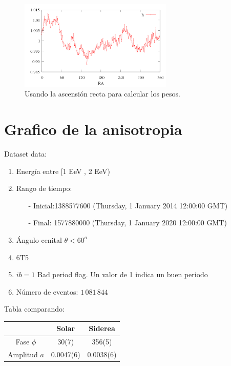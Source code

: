 		
		\begin{figure}[H]
			\centering
			\includegraphics[width=0.65\textwidth]{eventos_RA.png}
			\caption{Usando la ascensión recta para calcular los pesos.}
		\end{figure}
		

\section{Grafico de la anisotropia}

		
		Dataset data:
		
		
		\begin{enumerate}
			\item Energía entre  [1 EeV , 2 EeV)
			\item Rango de tiempo:
			\begin{itemize}
				\item[-] Inicial:1388577600 (Thursday, 1 January 2014 12:00:00 GMT)
				\item[-] Final: 1577880000  (Thursday, 1 January 2020 12:00:00 GMT)
			\end{itemize}
			\item Ángulo cenital $\theta < 60^o$
			\item 6T5
			\item $ib=1$ Bad period flag. Un valor de 1 indica un buen periodo
			\item Número de eventos: $1\,081\,844$
		\end{enumerate}
		
		
		
		Tabla comparando:
		
		\begin{table}[H]
		\centering
		
		\begin{tabular}{c|c|c}
					& Solar 		& Siderea\\ \hline
		Fase $\phi$ & 30(7) 	    & 356(5) 			\\
		Amplitud $a$& 0.0047(6)	    &0.0038(6)			\\
		\end{tabular}
		
		\end{table}
		
